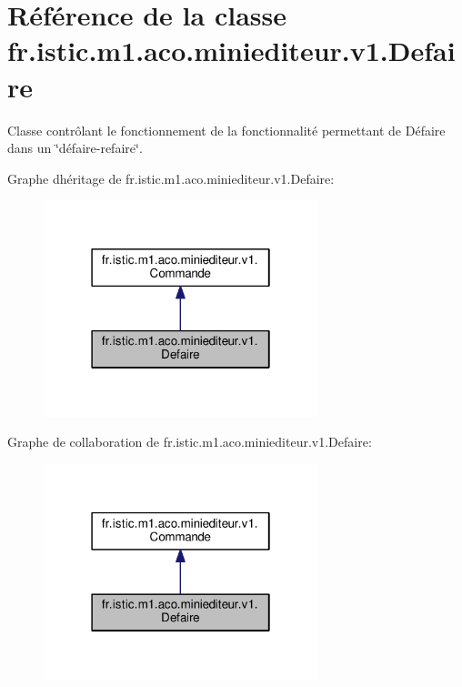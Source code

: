 \hypertarget{classfr_1_1istic_1_1m1_1_1aco_1_1miniediteur_1_1v1_1_1Defaire}{}\section{Référence de la classe fr.\+istic.\+m1.\+aco.\+miniediteur.\+v1.\+Defaire}
\label{classfr_1_1istic_1_1m1_1_1aco_1_1miniediteur_1_1v1_1_1Defaire}


Classe contrôlant le fonctionnement de la fonctionnalité permettant de Défaire dans un \char`\"{}défaire-\/refaire\char`\"{}.  




Graphe d\textquotesingle{}héritage de fr.\+istic.\+m1.\+aco.\+miniediteur.\+v1.\+Defaire\+:\nopagebreak
\begin{figure}[H]
\begin{center}
\leavevmode
\includegraphics[width=226pt]{classfr_1_1istic_1_1m1_1_1aco_1_1miniediteur_1_1v1_1_1Defaire__inherit__graph}
\end{center}
\end{figure}


Graphe de collaboration de fr.\+istic.\+m1.\+aco.\+miniediteur.\+v1.\+Defaire\+:\nopagebreak
\begin{figure}[H]
\begin{center}
\leavevmode
\includegraphics[width=226pt]{classfr_1_1istic_1_1m1_1_1aco_1_1miniediteur_1_1v1_1_1Defaire__coll__graph}
\end{center}
\end{figure}
